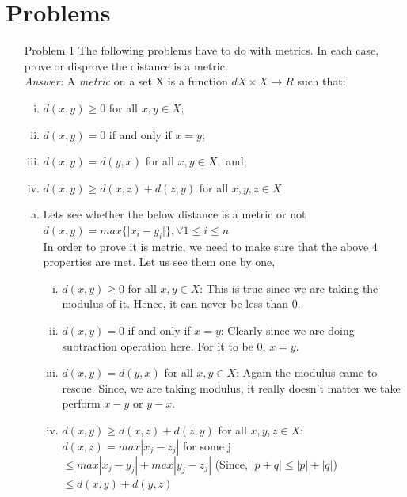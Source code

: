 \documentclass{article}
\begin{document}
\section*{Problems}
\begin{enumerate}
	\item[Problem] 1  
		The following problems have to do with metrics. In each case, prove or disprove the distance is a metric.\\
	\emph{Answer:} A \emph{metric} on a set X is a function $d  X \times X \to R$ such that:
	\begin{enumerate}[(i)]
			\item $d(x, y) \ge 0$ for all $x, y \in X$;
			\item $d(x, y) = 0$ if and only if  $x = y$;
			\item $d(x, y) = d(y, x)$ for all $x, y \in X,$ and;
			\item $d(x, y) \ge d(x, z) + d(z, y)$ for all $x, y, z \in X$
	\end{enumerate}
	\begin{enumerate}[(a)]
			\item Lets  see whether the below distance is a metric or not\\
			$d(x, y) = max\{\mid x_i - y_i\mid\}, \forall  1 \le i \le n$ \\
			In order to prove it is metric, we need to make sure that the above 4 properties are met. Let us see them one by one,\\
			\begin{enumerate}[(i)]
			\item $d(x, y) \ge 0$ for all $x, y \in X$: This is true since we are taking the modulus of it. Hence, it can never be less than 0.
			\item $d(x, y) = 0$ if and only if  $x = y$: Clearly since we are doing subtraction operation here. For it to be 0, $x=y$.
			\item $d(x, y) = d(y, x)$ for all $x, y \in X$:  Again the modulus came to rescue. Since, we are taking modulus, it really doesn't matter we take perform $x-y$ or $y-x$.
			\item $d(x, y) \ge d(x, z) + d(z, y)$ for all $x, y, z \in X$: \\
				$d(x, z) = max| x_j - z_j |$ for some j \\		
						$\le max|x_j - y_j| + max|y_j - z_j|$  (Since, $|p + q| \le |p| + |q|$)\\ 
						$\le d(x, y) + d(y, z)$
			\end{enumerate}



\end{enumerate}
\end{enumerate}
\end{document}
